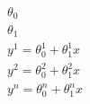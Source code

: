 \documentclass{standalone}
\begin{document}
    \begin{align}
        \theta_{0}\\
        \theta_{1}\\
        y^1=\theta_0^1 + \theta_1^1 x\\
        y^2=\theta_0^2 + \theta_1^2 x\\
        y^n=\theta_0^n + \theta_1^n x
    \end{align}
\end{document}
